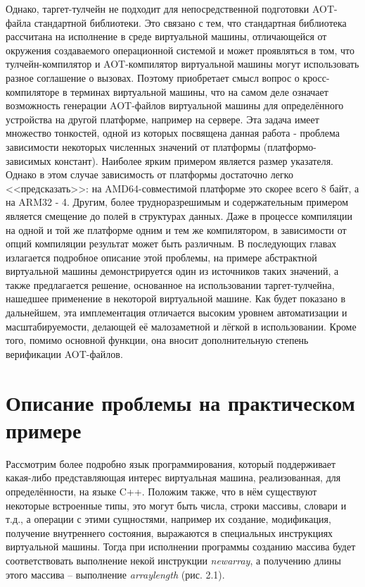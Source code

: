 \par
Однако, таргет-тулчейн не подходит для непосредственной подготовки AOT-файла стандартной библиотеки.
Это связано с тем, что стандартная библиотека рассчитана на исполнение в среде виртуальной машины, отличающейся от окружения создаваемого операционной системой и может проявляться в том, что тулчейн-компилятор и AOT-компилятор виртуальной машины могут использовать разное соглашение о вызовах.
Поэтому приобретает смысл вопрос о кросс-компиляторе в терминах виртуальной машины, что на самом деле означает возможность генерации AOT-файлов виртуальной машины для определённого устройства на другой платформе, например на сервере. Эта задача имеет множество тонкостей, одной из которых посвящена данная работа - проблема зависимости некоторых численных значений от платформы (платформо-зависимых констант).
Наиболее ярким примером является размер указателя.
Однако в этом случае зависимость от платформы достаточно легко <<предсказать>>: на AMD64-совместимой платформе это скорее всего 8 байт, а на ARM32 - 4.
Другим, более трудноразрешимым и содержательным примером является смещение до полей в структурах данных.
Даже в процессе компиляции на одной и той же платформе одним и тем же компилятором, в зависимости от опций компиляции результат может быть различным.
В последующих главах излагается подробное описание этой проблемы, на примере абстрактной виртуальной машины демонстрируется один из источников таких значений, а также предлагается решение, основанное на использовании таргет-тулчейна, нашедшее применение в некоторой виртуальной машине.
Как будет показано в дальнейшем, эта имплементация отличается высоким уровнем автоматизации и масштабируемости, делающей её малозаметной и лёгкой в использовании.
Кроме того, помимо основной функции, она вносит дополнительную степень верификации AOT-файлов.

\section[Описание проблемы]{Описание проблемы на практическом примере}
Рассмотрим более подробно язык программирования, который поддерживает какая-либо представляющая интерес виртуальная машина, реализованная, для определённости, на языке C++.
Положим также, что в нём существуют некоторые встроенные типы, это могут быть числа, строки массивы, словари и т.д., а операции с этими сущностями, например их создание, модификация, получение внутреннего состояния, выражаются в специальных инструкциях виртуальной машины.
Тогда при исполнении программы созданию массива будет соответствовать выполнение некой инструкции \textit{newarray}, а получению длины этого массива -- выполнение \textit{arraylength} (рис. 2.1).

